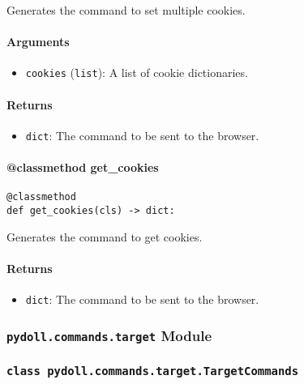 \documentclass{article}
\begin{document}
\noindent Generates the command to set multiple cookies.

\paragraph{Arguments}

\begin{itemize}
    \item \lstinline[style=pythonstyle]|cookies| (\lstinline[style=pythonstyle]|list|): A list of cookie dictionaries.
\end{itemize}

\paragraph{Returns}

\begin{itemize}
    \item \lstinline[style=pythonstyle]|dict|: The command to be sent to the browser.
\end{itemize}

\paragraph{@classmethod get\_cookies}

\begin{lstlisting}[style=pythonstyle]
@classmethod
def get_cookies(cls) -> dict:
\end{lstlisting}

\noindent Generates the command to get cookies.

\paragraph{Returns}

\begin{itemize}
    \item \lstinline[style=pythonstyle]|dict|: The command to be sent to the browser.
\end{itemize}

\subsubsection*{\texttt{pydoll.commands.target} Module}

\subsubsection*{\texttt{class pydoll.commands.target.TargetCommands}}
\end{document}
